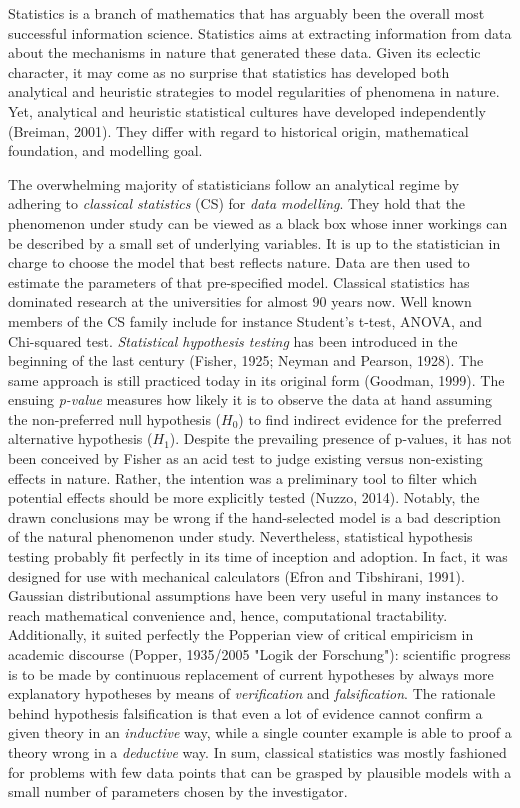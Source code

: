 \documentclass[authoryear,review,3p]{elsarticle}
\begin{document}
Statistics is a branch of mathematics that has arguably been the
overall most successful information science.
Statistics aims at extracting information from data
about the mechanisms in nature that generated these data.
%
Given its eclectic character, it may come as no surprise that statistics
has developed both analytical and heuristic strategies
to model regularities of phenomena in nature.
Yet, analytical and heuristic statistical cultures
have developed independently (Breiman, 2001).
They differ with regard to historical origin, mathematical foundation,
and modelling goal.

The overwhelming majority of statisticians
follow an analytical regime by
adhering to \textit{classical statistics} (CS) for
\textit{data modelling}.
They hold that the phenomenon under study can be viewed as a black box
whose inner workings can be described by a small set of
underlying variables.
It is up to the statistician in charge
to choose the model that best reflects nature.
Data are then used to estimate the parameters of that pre-specified model.
Classical statistics has dominated research at the universities
for almost 90 years now.
%
Well known members of the CS family include for instance
Student's t-test, ANOVA,
and Chi-squared test.
\textit{Statistical hypothesis testing} has been introduced in the beginning
of the last century (Fisher, 1925; Neyman and Pearson, 1928).
The same approach is still practiced today in its original form (Goodman, 1999).  
%
The ensuing \textit{p-value} measures how likely it is
to observe the data at hand
assuming the non-preferred null hypothesis ($H_0$)
to find indirect evidence
for the preferred alternative hypothesis ($H_1$).
%
Despite the prevailing presence of p-values,
it has not been conceived by Fisher as an acid test
to judge existing versus non-existing effects in nature.
Rather, the intention was a preliminary tool to
filter which potential effects should be more explicitly tested (Nuzzo, 2014).
%
Notably, the drawn conclusions may be wrong
if the hand-selected model is a bad description of
the natural phenomenon under study.
%
Nevertheless, statistical hypothesis testing probably fit perfectly
in its time of inception and adoption.
In fact, it was designed for use with mechanical calculators
(Efron and Tibshirani, 1991).
Gaussian distributional assumptions
have been very useful in many instances to reach
mathematical convenience and, hence, computational tractability.
Additionally, it suited perfectly the Popperian view of
critical empiricism in academic discourse
(Popper, 1935/2005 "Logik der Forschung"):
scientific progress is to be made by continuous replacement of current
hypotheses by always more explanatory hypotheses
by means of \textit{verification} and \textit{falsification}.
The rationale behind hypothesis falsification
is that even a lot of evidence cannot confirm
a given theory in an \textit{inductive} way, 
while a single counter example is able to proof a theory wrong
in a \textit{deductive} way.
%
In sum,
classical statistics was mostly fashioned
for problems with few data points that can be grasped 
by plausible models with a small number of parameters chosen by the
investigator.
\end{document}
